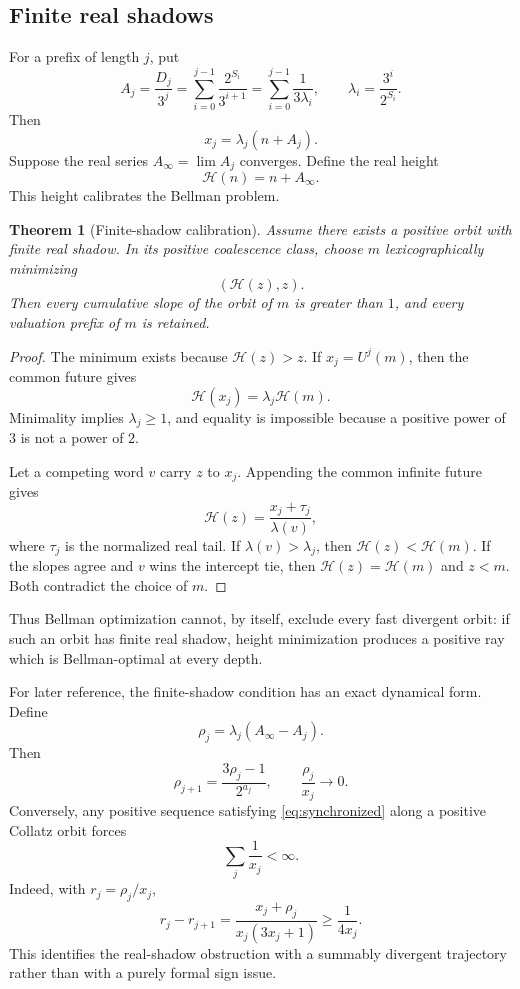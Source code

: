 \documentclass[11pt,reqno]{amsart}
\numberwithin{equation}{section}
\newtheorem{theorem}{Theorem}[section]
\theoremstyle{definition}
\theoremstyle{remark}
\newcommand{\cH}{\mathscr H}
\begin{document}
\subsection{Finite real shadows}

For a prefix of length $j$, put
\begin{equation}\label{eq:Aj}
 A_j=\frac{D_j}{3^j}
 =\sum_{i=0}^{j-1}\frac{2^{S_i}}{3^{i+1}}
 =\sum_{i=0}^{j-1}\frac{1}{3\lambda_i},
 \qquad
 \lambda_i=\frac{3^i}{2^{S_i}}.
\end{equation}
Then
\begin{equation}\label{eq:xjheight}
 x_j=\lambda_j(n+A_j).
\end{equation}
Suppose the real series $A_\infty=\lim A_j$ converges.  Define the real height
\[
 \cH(n)=n+A_\infty.
\]
This height calibrates the Bellman problem.

\begin{theorem}[Finite-shadow calibration]\label{thm:calibration}
Assume there exists a positive orbit with finite real shadow.  In its positive coalescence class, choose $m$ lexicographically minimizing
\[
 (\cH(z),z).
\]
Then every cumulative slope of the orbit of $m$ is greater than $1$, and every valuation prefix of $m$ is retained.
\end{theorem}

\begin{proof}
The minimum exists because $\cH(z)>z$.  If $x_j=U^j(m)$, then the common future gives
\[
 \cH(x_j)=\lambda_j\cH(m).
\]
Minimality implies $\lambda_j\ge1$, and equality is impossible because a positive power of $3$ is not a power of $2$.

Let a competing word $v$ carry $z$ to $x_j$.  Appending the common infinite future gives
\[
 \cH(z)=\frac{x_j+\tau_j}{\lambda(v)},
\]
where $\tau_j$ is the normalized real tail.  If $\lambda(v)>\lambda_j$, then $\cH(z)<\cH(m)$.  If the slopes agree and $v$ wins the intercept tie, then $\cH(z)=\cH(m)$ and $z<m$.  Both contradict the choice of $m$.
\end{proof}

Thus Bellman optimization cannot, by itself, exclude every fast divergent orbit: if such an orbit has finite real shadow, height minimization produces a positive ray which is Bellman-optimal at every depth.

For later reference, the finite-shadow condition has an exact dynamical form.  Define
\[
 \rho_j=\lambda_j(A_\infty-A_j).
\]
Then
\begin{equation}\label{eq:synchronized}
 \rho_{j+1}=\frac{3\rho_j-1}{2^{a_j}},
 \qquad
 \frac{\rho_j}{x_j}\longrightarrow0.
\end{equation}
Conversely, any positive sequence satisfying \eqref{eq:synchronized} along a positive Collatz orbit forces
\[
 \sum_j\frac1{x_j}<\infty.
\]
Indeed, with $r_j=\rho_j/x_j$,
\[
 r_j-r_{j+1}
 =\frac{x_j+\rho_j}{x_j(3x_j+1)}
 \ge\frac1{4x_j}.
\]
This identifies the real-shadow obstruction with a summably divergent trajectory rather than with a purely formal sign issue.
\end{document}
